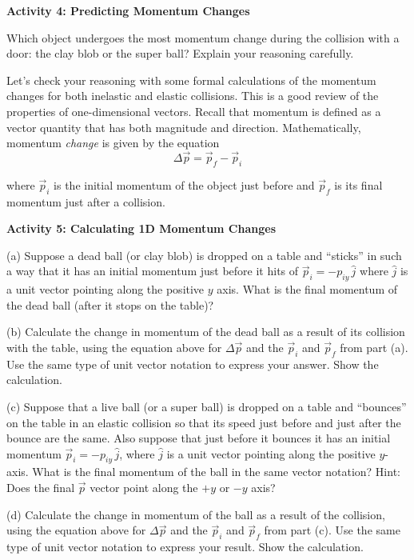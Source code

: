 \newpage

\textbf{Activity 4: Predicting Momentum Changes }

Which object undergoes the most momentum change during the collision with a
door: the clay blob or the super ball? Explain your reasoning carefully.
\vspace{20mm}

Let's check your reasoning with some formal calculations of the momentum changes
for both inelastic and elastic collisions. This is a good review of the properties
of one-dimensional vectors. Recall that momentum is defined as a vector quantity
that has both magnitude and direction. Mathematically, momentum \emph{change} 
is given by the equation
\[
\Delta {\vec p}={{\vec p}_{f}}-{{\vec p}_{i}}\]


where \( {{\vec p}_{i}} \) is the initial momentum of the object just
before and \( {{\vec p}_{f}} \) is its final momentum just after a
collision.

\textbf{Activity 5: Calculating 1D Momentum Changes} 

(a) Suppose a dead ball (or clay blob) is dropped on a table and ``sticks''
in such a way that it has an initial momentum just before it hits of 
\( {{\vec p}_{i}}=-p_{iy}\, \widehat{j} \)
where \( \widehat{ j} \) is a unit vector pointing along the positive $y$ axis.
What is the final momentum of the dead ball (after it stops on the table)? 
\vspace{15mm}

(b) Calculate the change in momentum of the dead ball as a result of its collision
with the table, using the equation above for $\Delta {\vec p}$ and the \( {{\vec p}_{i}} \) and 
\( {{\vec p}_{f}} \) from part (a). Use the same type of unit vector notation to express your 
answer. Show the calculation.
\vspace{20mm}

(c) Suppose that a live ball (or a super ball) is dropped on a table and ``bounces''
on the table in an elastic collision so that its speed just before and just
after the bounce are the same. Also suppose that just before it bounces it has
an initial momentum \( {{\vec p}_{i}}=-p_{iy}\, \widehat{j} \),
where \( \widehat{j} \)
is a unit vector pointing along the positive $y$-axis. What is the final momentum
of the ball in the same vector notation? Hint: Does the final 
\( {\vec p} \)
vector point along the $+y$ or $-y$ axis? 
\vspace{15mm}

(d) Calculate the change in momentum of the ball as a result of the collision, using the equation above for \( \Delta {\vec p} \) and the \( {{\vec p}_{i}} \) and \( {{\vec p}_{f}} \) from part (c).
Use the same type of unit vector notation to express your result. Show the calculation.
\vspace{20mm}

